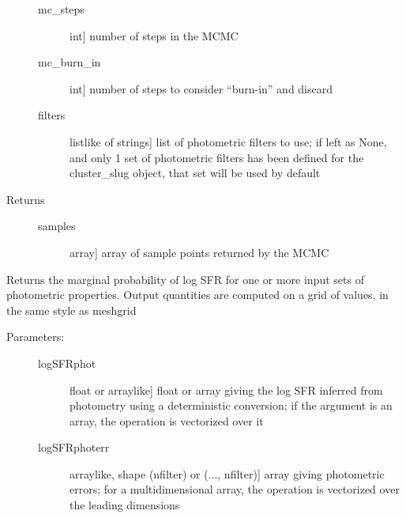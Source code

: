 \documentclass[letterpaper,10pt,english]{sphinxmanual}
\begin{document}
\begin{fulllineitems}
\begin{fulllineitems}
\begin{description}
\begin{description}
\item[{mc\_steps}] \leavevmode{[}int{]}
number of steps in the MCMC

\item[{mc\_burn\_in}] \leavevmode{[}int{]}
number of steps to consider ``burn-in'' and discard

\item[{filters}] \leavevmode{[}listlike of strings{]}
list of photometric filters to use; if left as None, and
only 1 set of photometric filters has been defined for
the cluster\_slug object, that set will be used by
default

\end{description}

\item[{Returns}] \leavevmode\begin{description}
\item[{samples}] \leavevmode{[}array{]}
array of sample points returned by the MCMC

\end{description}

\end{description}

\end{fulllineitems}


\begin{fulllineitems}
\label{sfr_slug:slugpy.sfr_slug.sfr_slug.mpdf}
Returns the marginal probability of log SFR for one or more
input sets of photometric properties. Output quantities are
computed on a grid of values, in the same style as meshgrid
\begin{description}
\item[{Parameters:}] \leavevmode\begin{description}
\item[{logSFRphot}] \leavevmode{[}float or arraylike{]}
float or array giving the log SFR inferred from
photometry using a deterministic conversion; if the
argument is an array, the operation is vectorized over
it

\item[{logSFRphoterr}] \leavevmode{[}arraylike, shape (nfilter) or (..., nfilter){]}
array giving photometric errors; for a multidimensional
array, the operation is vectorized over the leading
dimensions


\end{description}
\end{description}
\end{fulllineitems}
\end{fulllineitems}
\end{document}
